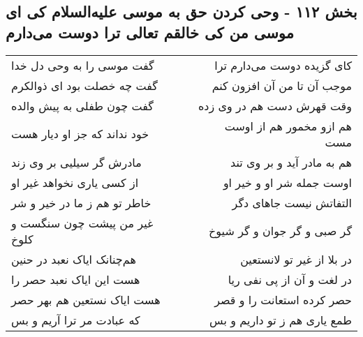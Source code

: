 \begin{center}
\section*{بخش ۱۱۲ - وحی کردن حق به موسی علیه‌السلام کی ای موسی من کی  خالقم تعالی ترا دوست می‌دارم}
\label{sec:sh112}
\begin{longtable}{l p{0.5cm} r}
گفت موسی را به وحی دل خدا
&&
کای گزیده دوست می‌دارم ترا
\\
گفت چه خصلت بود ای ذوالکرم
&&
موجب آن تا من آن افزون کنم
\\
گفت چون طفلی به پیش والده
&&
وقت قهرش دست هم در وی زده
\\
خود نداند که جز او دیار هست
&&
هم ازو مخمور هم از اوست مست
\\
مادرش گر سیلیی بر وی زند
&&
هم به مادر آید و بر وی تند
\\
از کسی یاری نخواهد غیر او
&&
اوست جمله شر او و خیر او
\\
خاطر تو هم ز ما در خیر و شر
&&
التفاتش نیست جاهای دگر
\\
غیر من پیشت چون سنگست و کلوخ
&&
گر صبی و گر جوان و گر شیوخ
\\
هم‌چنانک ایاک نعبد در حنین
&&
در بلا از غیر تو لانستعین
\\
هست این ایاک نعبد حصر را
&&
در لغت و آن از پی نفی ریا
\\
هست ایاک نستعین هم بهر حصر
&&
حصر کرده استعانت را و قصر
\\
که عبادت مر ترا آریم و بس
&&
طمع یاری هم ز تو داریم و بس
\\
\end{longtable}
\end{center}
